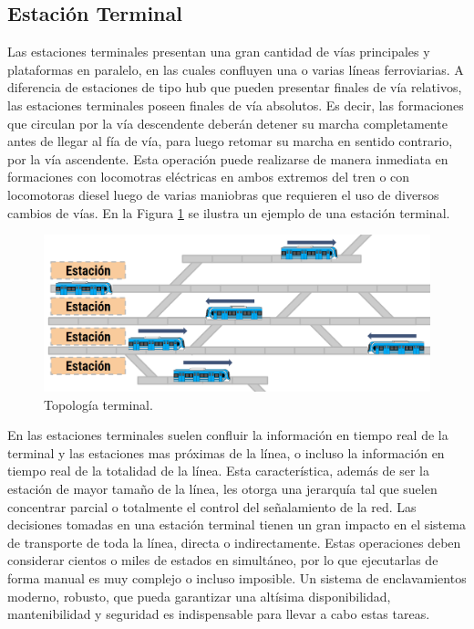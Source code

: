\subsection{Estación Terminal}

Las estaciones terminales presentan una gran cantidad de vías principales y plataformas en paralelo, en las cuales confluyen una o varias líneas ferroviarias. A diferencia de estaciones de tipo hub que pueden presentar finales de vía relativos, las estaciones terminales poseen finales de vía absolutos. Es decir, las formaciones que circulan por la vía descendente deberán detener su marcha completamente antes de llegar al fía de vía, para luego retomar su marcha en sentido contrario, por la vía ascendente. Esta operación puede realizarse de manera inmediata en formaciones con locomotras eléctricas en ambos extremos del tren o con locomotoras diesel luego de varias maniobras que requieren el uso de diversos cambios de vías. En la Figura \ref{fig:terminal_1} se ilustra un ejemplo de una estación terminal.

    \begin{figure}[h]
        \centering
        \includegraphics[width=1\textwidth]{Figuras/terminal}
        \centering\caption{Topología terminal.}
        \label{fig:terminal_1}
    \end{figure}

En las estaciones terminales suelen confluir la información en tiempo real de la terminal y las estaciones mas próximas de la línea, o incluso la información en tiempo real de la totalidad de la línea. Esta característica, además de ser la estación de mayor tamaño de la línea, les otorga una jerarquía tal que suelen concentrar parcial o totalmente el control del señalamiento de la red. Las decisiones tomadas en una estación terminal tienen un gran impacto en el sistema de transporte de toda la línea, directa o indirectamente. Estas operaciones deben considerar cientos o miles de estados en simultáneo, por lo que ejecutarlas de forma manual es muy complejo o incluso imposible. Un sistema de enclavamientos moderno, robusto, que pueda garantizar una altísima disponibilidad, mantenibilidad y seguridad es indispensable para llevar a cabo estas tareas.